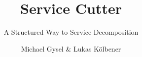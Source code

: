 \documentclass[hsr-ba,english]{hgbthesis}
\begin{document}

\bigskipamount=30pt

\title{Service Cutter}
\subtitle{A Structured Way to Service Decomposition}
\author{Michael Gysel \& Lukas K\"{o}lbener}



\frontmatter
\maketitle
\setcounter{tocdepth}{1}
\tableofcontents

			

\mainmatter         %

\makeatletter
\renewcommand{\@makechapterhead}[1]{%
\vspace*{50 pt}%
{\setlength{\parindent}{0pt} \raggedright \normalfont
\bfseries\Huge\thechapter.\ #1
\par\nobreak\vspace{40 pt}}}
\makeatother




















\appendix
\end{document}
